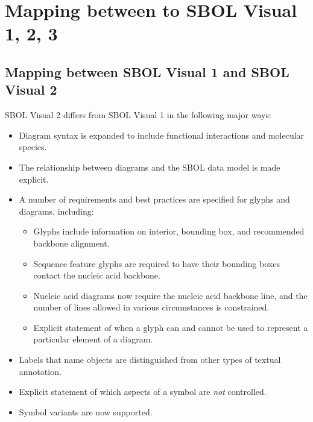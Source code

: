 \section{Mapping between to SBOL Visual 1, 2, 3}\label{sec:specmapping}

\subsection{Mapping between SBOL Visual 1 and SBOL Visual 2}\label{sec:sbol1}

SBOL Visual 2 differs from SBOL Visual 1 in the following major ways:
\begin{itemize}
\item Diagram syntax is expanded to include functional interactions and molecular species.
\item The relationship between diagrams and the SBOL data model is made explicit.
\item A number of requirements and best practices are specified for glyphs and diagrams, including:
	\begin{itemize}
	\item Glyphs include information on interior, bounding box, and recommended backbone alignment.
	\item Sequence feature glyphs are required to have their bounding boxes contact the nucleic acid backbone.
	\item Nucleic acid diagrams now require the nucleic acid backbone line, and the number of lines allowed in various circumstances is constrained.
	\item Explicit statement of when a glyph can and cannot be used to represent a particular element of a diagram.
	\end{itemize}
\item Labels that name objects are distinguished from other types of textual annotation.
\item Explicit statement of which aspects of a symbol are {\em not} controlled.
\item Symbol variants are now supported.
\end{itemize}

